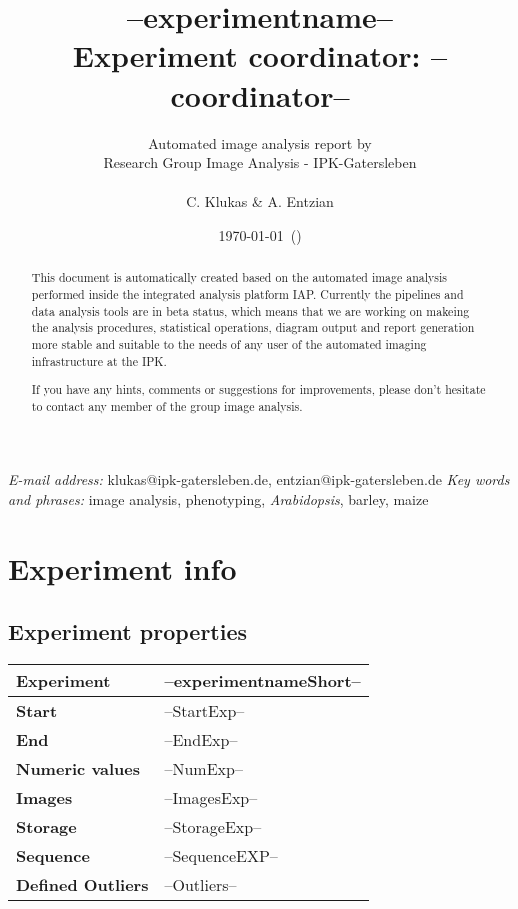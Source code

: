 \documentclass[%
  paper=a4, %
  pagesize, %
  DIV=calc, %
  headings=small,%
  english,   %
  oneside
]{scrartcl}  %
\providecommand{\tabularnewline}{\\}
\begin{document}
\title{--experimentname-- \tabularnewline \vspace{10 mm} \large{Experiment coordinator: --coordinator--}}

\author{Automated image analysis report by\tabularnewline Research
Group Image Analysis - IPK-Gatersleben\tabularnewline \tabularnewline C. Klukas
\& A. Entzian}

\date{\today ~(\currenttime )}

\maketitle
\thispagestyle{empty}  
\begin{abstract}
This document is automatically created based on the automated image analysis performed 
inside the integrated analysis platform IAP. Currently the pipelines and data analysis tools are in beta status, 
which means that we are working on makeing the analysis procedures, statistical operations, diagram output and report
generation more stable and suitable to the needs of any user of the automated imaging infrastructure at the IPK.

If you have any hints, comments or suggestions for improvements, please don't hesitate to contact any member
of the group image analysis.
\end{abstract}
\vfill
\small{\textit{E-mail address:} klukas@ipk-gatersleben.de, entzian@ipk-gatersleben.de}
\newline 
\small{\textit{Key words and phrases:} image analysis, phenotyping, \textit{Arabidopsis}, barley, maize }
 
\addtocounter{page}{-1}
\clearpage
\tableofcontents

\clearpage
\pagestyle{headings}
\section{Experiment info} 
\subsection{Experiment properties}
\begin{center}
	\begin{tabular}{|p{3cm}|p{13cm}|}
	\hline
	{\textbf{Experiment}} & --experimentnameShort--\tabularnewline
	\hline
	\hline
	{\textbf{Start}} & --StartExp--\tabularnewline
	\hline
	{\textbf{End}} & --EndExp--\tabularnewline
	\hline
	{\textbf{Numeric values}} & --NumExp-- \tabularnewline
	\hline
	{\textbf{Images}} & --ImagesExp-- \tabularnewline
	\hline
	{\textbf{Storage}} & --StorageExp-- \tabularnewline
	\hline
	{\textbf{Sequence}} & --SequenceEXP-- \tabularnewline
	\hline
	{\textbf{Defined Outliers}} & --Outliers-- \tabularnewline
	\hline
	\hline 
	\end{tabular}
\end{center}
\end{document}

